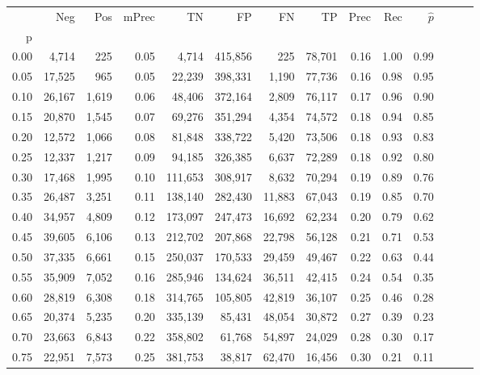 \begin{tabular}{rrrrrrrrrrrrrr}
\toprule
{} &     Neg &    Pos & mPrec &       TN &       FP &      FN &      TP &  Prec &   Rec & $\hat{p}$ \\
p    &         &        &       &          &          &         &         &       &       &           \\
\midrule
0.00 &   4,714 &    225 &  0.05 &    4,714 &  415,856 &     225 &  78,701 &  0.16 &  1.00 &      0.99 \\
0.05 &  17,525 &    965 &  0.05 &   22,239 &  398,331 &   1,190 &  77,736 &  0.16 &  0.98 &      0.95 \\
0.10 &  26,167 &  1,619 &  0.06 &   48,406 &  372,164 &   2,809 &  76,117 &  0.17 &  0.96 &      0.90 \\
0.15 &  20,870 &  1,545 &  0.07 &   69,276 &  351,294 &   4,354 &  74,572 &  0.18 &  0.94 &      0.85 \\
0.20 &  12,572 &  1,066 &  0.08 &   81,848 &  338,722 &   5,420 &  73,506 &  0.18 &  0.93 &      0.83 \\
0.25 &  12,337 &  1,217 &  0.09 &   94,185 &  326,385 &   6,637 &  72,289 &  0.18 &  0.92 &      0.80 \\
0.30 &  17,468 &  1,995 &  0.10 &  111,653 &  308,917 &   8,632 &  70,294 &  0.19 &  0.89 &      0.76 \\
0.35 &  26,487 &  3,251 &  0.11 &  138,140 &  282,430 &  11,883 &  67,043 &  0.19 &  0.85 &      0.70 \\
0.40 &  34,957 &  4,809 &  0.12 &  173,097 &  247,473 &  16,692 &  62,234 &  0.20 &  0.79 &      0.62 \\
0.45 &  39,605 &  6,106 &  0.13 &  212,702 &  207,868 &  22,798 &  56,128 &  0.21 &  0.71 &      0.53 \\
0.50 &  37,335 &  6,661 &  0.15 &  250,037 &  170,533 &  29,459 &  49,467 &  0.22 &  0.63 &      0.44 \\
0.55 &  35,909 &  7,052 &  0.16 &  285,946 &  134,624 &  36,511 &  42,415 &  0.24 &  0.54 &      0.35 \\
0.60 &  28,819 &  6,308 &  0.18 &  314,765 &  105,805 &  42,819 &  36,107 &  0.25 &  0.46 &      0.28 \\
0.65 &  20,374 &  5,235 &  0.20 &  335,139 &   85,431 &  48,054 &  30,872 &  0.27 &  0.39 &      0.23 \\
0.70 &  23,663 &  6,843 &  0.22 &  358,802 &   61,768 &  54,897 &  24,029 &  0.28 &  0.30 &      0.17 \\
0.75 &  22,951 &  7,573 &  0.25 &  381,753 &   38,817 &  62,470 &  16,456 &  0.30 &  0.21 &      0.11 \\

\end{tabular}
